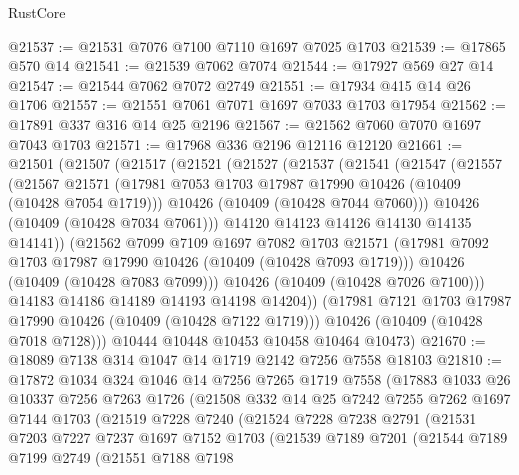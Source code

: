 \begin{lexlean}{RustCore}
\begin{coremodule}
@21537 := @21531 @7076 @7100 @7110 @1697 @7025 @1703
@21539 := @17865 @570 @14
@21541 := @21539 @7062 @7074
@21544 := @17927 @569 @27 @14
@21547 := @21544 @7062 @7072 @2749
@21551 := @17934 @415 @14 @26 @1706
@21557 := @21551 @7061 @7071 @1697 @7033 @1703 @17954
@21562 := @17891 @337 @316 @14 @25 @2196
@21567 := @21562 @7060 @7070 @1697 @7043 @1703
@21571 := @17968 @336 @2196 @12116 @12120
@21661 := @21501
    (@21507
      (@21517
        (@21521
          (@21527
            (@21537
              (@21541
                (@21547
                  (@21557
                    (@21567
                      @21571
                      (@17981 @7053 @1703 @17987 @17990 @10426 (@10409 (@10428 @7054 @1719)))
                      @10426
                      (@10409 (@10428 @7044 @7060)))
                    @10426
                    (@10409 (@10428 @7034 @7061)))
                  @14120
                  @14123
                  @14126
                  @14130
                  @14135
                  @14141))
              (@21562
                @7099
                @7109
                @1697
                @7082
                @1703
                @21571
                (@17981 @7092 @1703 @17987 @17990 @10426 (@10409 (@10428 @7093 @1719)))
                @10426
                (@10409 (@10428 @7083 @7099)))
              @10426
              (@10409 (@10428 @7026 @7100)))
            @14183
            @14186
            @14189
            @14193
            @14198
            @14204))
        (@17981 @7121 @1703 @17987 @17990 @10426 (@10409 (@10428 @7122 @1719)))
        @10426
        (@10409 (@10428 @7018 @7128)))
      @10444
      @10448
      @10453
      @10458
      @10464
      @10473)
@21670 := @18089 @7138 @314 @1047 @14 @1719 @2142 @7256 @7558 @18103
@21810 := @17872
    @1034
    @324
    @1046
    @14
    @7256
    @7265
    @1719
    @7558
    (@17883
      @1033
      @26
      @10337
      @7256
      @7263
      @1726
      (@21508
        @332
        @14
        @25
        @7242
        @7255
        @7262
        @1697
        @7144
        @1703
        (@21519
          @7228
          @7240
          (@21524
            @7228
            @7238
            @2791
            (@21531
              @7203
              @7227
              @7237
              @1697
              @7152
              @1703
              (@21539
                @7189
                @7201
                (@21544
                  @7189
                  @7199
                  @2749
                  (@21551
                    @7188
                    @7198

\end{coremodule}
\end{lexlean}
